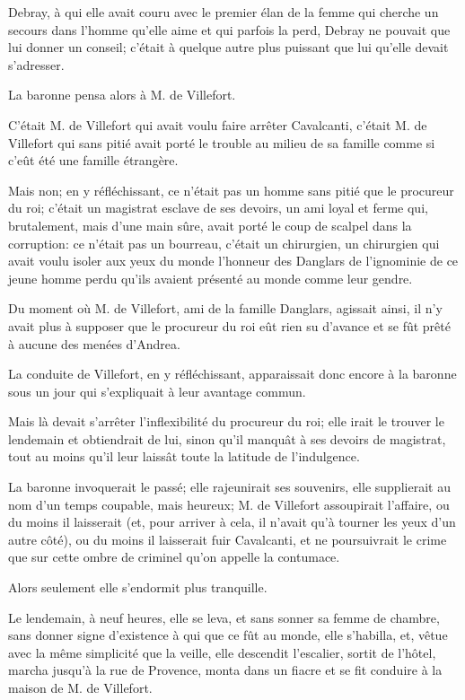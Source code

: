 Debray, à qui elle avait couru avec le premier élan de la femme qui cherche un secours dans l'homme qu'elle aime et qui parfois la perd, Debray ne pouvait que lui donner un conseil; c'était à quelque autre plus puissant que lui qu'elle devait s'adresser. 

La baronne pensa alors à M. de Villefort. 

C'était M. de Villefort qui avait voulu faire arrêter Cavalcanti, c'était M. de Villefort qui sans pitié avait porté le trouble au milieu de sa famille comme si c'eût été une famille étrangère. 

Mais non; en y réfléchissant, ce n'était pas un homme sans pitié que le procureur du roi; c'était un magistrat esclave de ses devoirs, un ami loyal et ferme qui, brutalement, mais d'une main sûre, avait porté le coup de scalpel dans la corruption: ce n'était pas un bourreau, c'était un chirurgien, un chirurgien qui avait voulu isoler aux yeux du monde l'honneur des Danglars de l'ignominie de ce jeune homme perdu qu'ils avaient présenté au monde comme leur gendre. 

Du moment où M. de Villefort, ami de la famille Danglars, agissait ainsi, il n'y avait plus à supposer que le procureur du roi eût rien su d'avance et se fût prêté à aucune des menées d'Andrea. 

La conduite de Villefort, en y réfléchissant, apparaissait donc encore à la baronne sous un jour qui s'expliquait à leur avantage commun. 

Mais là devait s'arrêter l'inflexibilité du procureur du roi; elle irait le trouver le lendemain et obtiendrait de lui, sinon qu'il manquât à ses devoirs de magistrat, tout au moins qu'il leur laissât toute la latitude de l'indulgence. 

La baronne invoquerait le passé; elle rajeunirait ses souvenirs, elle supplierait au nom d'un temps coupable, mais heureux; M. de Villefort assoupirait l'affaire, ou du moins il laisserait (et, pour arriver à cela, il n'avait qu'à tourner les yeux d'un autre côté), ou du moins il laisserait fuir Cavalcanti, et ne poursuivrait le crime que sur cette ombre de criminel qu'on appelle la contumace. 

Alors seulement elle s'endormit plus tranquille. 

Le lendemain, à neuf heures, elle se leva, et sans sonner sa femme de chambre, sans donner signe d'existence à qui que ce fût au monde, elle s'habilla, et, vêtue avec la même simplicité que la veille, elle descendit l'escalier, sortit de l'hôtel, marcha jusqu'à la rue de Provence, monta dans un fiacre et se fit conduire à la maison de M. de Villefort. 

